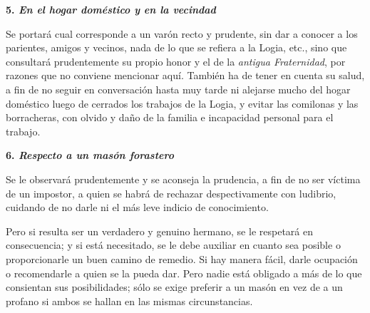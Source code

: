 \documentclass[a4paper,12pt,twoside]{book}
\begin{document}
\vspace{0.3cm}
\noindent \textbf{5. \textit{En el hogar doméstico y en la vecindad}}

\noindent Se portará cual corresponde a un varón recto y prudente, sin dar a conocer a los parientes, amigos y vecinos, nada de lo que se refiera a la Logia, etc., sino que consultará prudentemente su propio honor y el de la \textit{antigua Fraternidad}, por razones que no conviene mencionar aquí. También ha de tener en cuenta su salud, a fin de no seguir en conversación hasta muy tarde ni alejarse mucho del hogar doméstico luego de cerrados los trabajos de la Logia, y evitar las comilonas y las borracheras, con olvido y daño de la familia e incapacidad personal para el trabajo.

\vspace{0.3cm}
\noindent \textbf{6. \textit{Respecto a un masón forastero}}

\noindent Se le observará prudentemente y se aconseja la prudencia, a fin de no ser víctima de un impostor, a quien se habrá de rechazar despectivamente con ludibrio, cuidando de no darle ni el más leve indicio de conocimiento.

\noindent Pero si resulta ser un verdadero y genuino hermano, se le respetará en consecuencia; y si está necesitado, se le debe auxiliar en cuanto sea posible o proporcionarle un buen camino de remedio. Si hay manera fácil, darle ocupación o recomendarle a quien se la pueda dar. Pero nadie está obligado a más de lo que consientan sus posibilidades; sólo se exige preferir a un masón en vez de a un profano si ambos se hallan en las mismas circunstancias.
\end{document}

